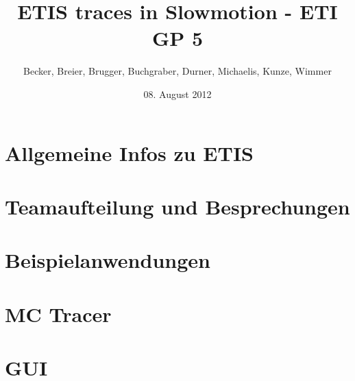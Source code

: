 \documentclass[10pt]{beamer}
\title[ETIS - ETI GP 5 - SS 2012]{ETIS traces in Slowmotion - ETI GP 5}
\author[Becker, Breier, Brugger, Buchgraber, Durner, Michaelis, Kunze, Wimmer]{\small{Becker, Breier, Brugger, Buchgraber, Durner, Michaelis, Kunze, Wimmer}}
\institute[TUM]{Technische Universität München}
\date[08.08.12]{08. August 2012}
\begin{document}
\begin{frame}
\titlepage
\end{frame}

\begin{frame}
\tableofcontents[hideallsubsections]
\end{frame}


\section{Allgemeine Infos zu ETIS} 
\section{Teamaufteilung und Besprechungen} 
\section{Beispielanwendungen} 
\section{MC Tracer} 
\section{GUI} 
\end{document}
